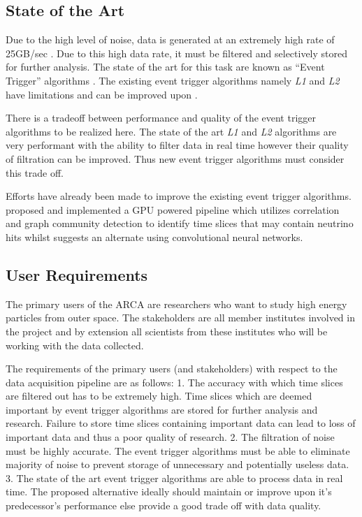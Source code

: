 \subsection{State of the Art}\label{state-of-the-art}

Due to the high level of noise, data is generated at an extremely high rate of
25GB/sec \cite{adrian2016letter}. Due to this high data rate, it must be
filtered and selectively stored for further analysis. The state of the art for
this task are known as ``Event Trigger'' algorithms
\cite{adrian2016letter,aiello2019km3net}. The existing event trigger algorithms
namely \emph{L1} and \emph{L2} have limitations and can be improved upon
\cite{karas2019data}.

There is a tradeoff between performance and quality of the event trigger
algorithms to be realized here. The state of the art \emph{L1} and \emph{L2}
algorithms are very performant with the ability to filter data in real time
however their quality of filtration can be improved. Thus new event trigger
algorithms must consider this trade off.

Efforts have already been made to improve the existing event trigger
algorithms. \cite{karas2019data} proposed and implemented a GPU powered
pipeline which utilizes correlation and graph community detection to identify
time slices that may contain neutrino hits whilst \cite{post2019km3nnet}
suggests an alternate using convolutional neural networks.

\subsection{User Requirements}\label{user-requirements}

The primary users of the ARCA are researchers who want to study high energy
particles from outer space. The stakeholders are all member institutes involved
in the project and by extension all scientists from these institutes who will
be working with the data collected.

The requirements of the primary users (and stakeholders) with respect to the
data acquisition pipeline are as follows: 1. The accuracy with which time
slices are filtered out has to be extremely high. Time slices which are deemed
important by event trigger algorithms are stored for further analysis and
research. Failure to store time slices containing important data can lead to
loss of important data and thus a poor quality of research. 2. The filtration
of noise must be highly accurate. The event trigger algorithms must be able to
eliminate majority of noise to prevent storage of unnecessary and potentially
useless data. 3. The state of the art event trigger algorithms are able to
process data in real time. The proposed alternative ideally should maintain or
improve upon it's predecessor's performance else provide a good trade off with
data quality.

